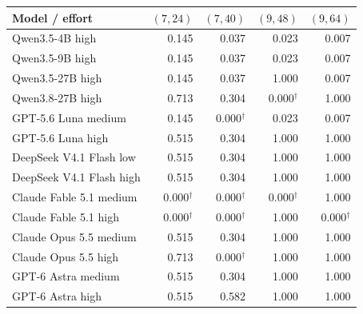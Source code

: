 \begin{tabularx}{\linewidth}{@{}Xrrrr@{}}
\toprule
Model / effort & $(7,24)$ & $(7,40)$ & $(9,48)$ & $(9,64)$ \\
\midrule
Qwen3.5-4B high & 0.145 & 0.037 & 0.023 & 0.007 \\
Qwen3.5-9B high & 0.145 & 0.037 & 0.023 & 0.007 \\
Qwen3.5-27B high & 0.145 & 0.037 & 1.000 & 0.007 \\
Qwen3.8-27B high & 0.713 & 0.304 & 0.000$^{\dagger}$ & 1.000 \\
GPT-5.6 Luna medium & 0.145 & 0.000$^{\dagger}$ & 0.023 & 0.007 \\
GPT-5.6 Luna high & 0.515 & 0.304 & 1.000 & 1.000 \\
DeepSeek V4.1 Flash low & 0.515 & 0.304 & 1.000 & 1.000 \\
DeepSeek V4.1 Flash high & 0.515 & 0.304 & 1.000 & 1.000 \\
Claude Fable 5.1 medium & 0.000$^{\dagger}$ & 0.000$^{\dagger}$ & 0.000$^{\dagger}$ & 1.000 \\
Claude Fable 5.1 high & 0.000$^{\dagger}$ & 0.000$^{\dagger}$ & 1.000 & 0.000$^{\dagger}$ \\
Claude Opus 5.5 medium & 0.515 & 0.304 & 1.000 & 1.000 \\
Claude Opus 5.5 high & 0.713 & 0.000$^{\dagger}$ & 1.000 & 1.000 \\
GPT-6 Astra medium & 0.515 & 0.304 & 1.000 & 1.000 \\
GPT-6 Astra high & 0.515 & 0.582 & 1.000 & 1.000 \\
\bottomrule
\end{tabularx}
